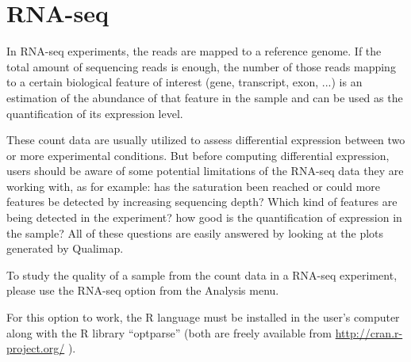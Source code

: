 \documentclass[a4paper,10pt,english]{sphinxmanual}
\begin{document}
\section{RNA-seq}
\label{analysis:rna-seq}\label{analysis:id3}
In RNA-seq experiments, the reads are mapped to a reference genome. If the total amount of sequencing reads is enough, the number of those reads mapping to a certain biological feature of interest (gene,
transcript, exon, ...) is an estimation of the abundance of that feature in the sample and can be used
as the quantification of its expression level.

These count data are usually utilized to assess differential expression between two or more experimental conditions. But before computing differential expression, users should be aware of some potential limitations of the RNA-seq data they are working with, as for example: has the saturation been reached or could more features be detected by increasing sequencing  depth? Which kind of features are being detected in the experiment? how good is the quantification of expression in the sample? All of these questions are easily answered by looking at the plots generated by Qualimap.

To study the quality of a sample from the count data in a RNA-seq experiment, please use the
RNA-seq option from the Analysis menu.

For this option to work, the R language must be installed in the user’s computer along with the R library “optparse” (both are freely available from \href{http://cran.r-project.org/}{http://cran.r-project.org/} ).
\end{document}
